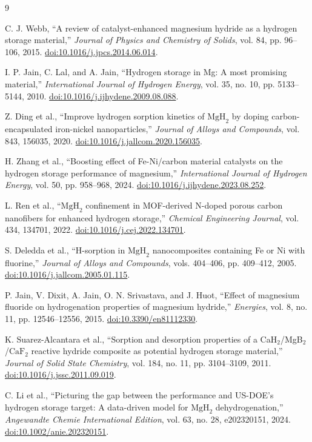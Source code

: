 \documentclass[11pt,a4paper]{article}
\newcommand{\MgHtwo}{\ensuremath{\mathrm{MgH}_{2}}}
\newcommand{\CaFtwo}{\ensuremath{\mathrm{CaF}_{2}}}
\begin{document}
\begin{thebibliography}{9}
\small
\setlength{\itemsep}{0.1em}
\setlength{\parskip}{0pt}

C. J. Webb, ``A review of catalyst-enhanced magnesium hydride as a hydrogen storage material,'' \emph{Journal of Physics and Chemistry of Solids}, vol. 84, pp. 96--106, 2015. \href{https://doi.org/10.1016/j.jpcs.2014.06.014}{doi:10.1016/j.jpcs.2014.06.014}.

I. P. Jain, C. Lal, and A. Jain, ``Hydrogen storage in Mg: A most promising material,'' \emph{International Journal of Hydrogen Energy}, vol. 35, no. 10, pp. 5133--5144, 2010. \href{https://doi.org/10.1016/j.ijhydene.2009.08.088}{doi:10.1016/j.ijhydene.2009.08.088}.

Z. Ding et al., ``Improve hydrogen sorption kinetics of \MgHtwo{} by doping carbon-encapsulated iron-nickel nanoparticles,'' \emph{Journal of Alloys and Compounds}, vol. 843, 156035, 2020. \href{https://doi.org/10.1016/j.jallcom.2020.156035}{doi:10.1016/j.jallcom.2020.156035}.

H. Zhang et al., ``Boosting effect of Fe-Ni/carbon material catalysts on the hydrogen storage performance of magnesium,'' \emph{International Journal of Hydrogen Energy}, vol. 50, pp. 958--968, 2024. \href{https://doi.org/10.1016/j.ijhydene.2023.08.252}{doi:10.1016/j.ijhydene.2023.08.252}.

L. Ren et al., ``\MgHtwo{} confinement in MOF-derived N-doped porous carbon nanofibers for enhanced hydrogen storage,'' \emph{Chemical Engineering Journal}, vol. 434, 134701, 2022. \href{https://doi.org/10.1016/j.cej.2022.134701}{doi:10.1016/j.cej.2022.134701}.

S. Deledda et al., ``H-sorption in \MgHtwo{} nanocomposites containing Fe or Ni with fluorine,'' \emph{Journal of Alloys and Compounds}, vols. 404--406, pp. 409--412, 2005. \href{https://doi.org/10.1016/j.jallcom.2005.01.115}{doi:10.1016/j.jallcom.2005.01.115}.

P. Jain, V. Dixit, A. Jain, O. N. Srivastava, and J. Huot, ``Effect of magnesium fluoride on hydrogenation properties of magnesium hydride,'' \emph{Energies}, vol. 8, no. 11, pp. 12546--12556, 2015. \href{https://doi.org/10.3390/en81112330}{doi:10.3390/en81112330}.

K. Suarez-Alcantara et al., ``Sorption and desorption properties of a CaH$_2$/MgB$_2$/\CaFtwo{} reactive hydride composite as potential hydrogen storage material,'' \emph{Journal of Solid State Chemistry}, vol. 184, no. 11, pp. 3104--3109, 2011. \href{https://doi.org/10.1016/j.jssc.2011.09.019}{doi:10.1016/j.jssc.2011.09.019}.

C. Li et al., ``Picturing the gap between the performance and US-DOE's hydrogen storage target: A data-driven model for \MgHtwo{} dehydrogenation,'' \emph{Angewandte Chemie International Edition}, vol. 63, no. 28, e202320151, 2024. \href{https://doi.org/10.1002/anie.202320151}{doi:10.1002/anie.202320151}.

\end{thebibliography}
\end{document}
